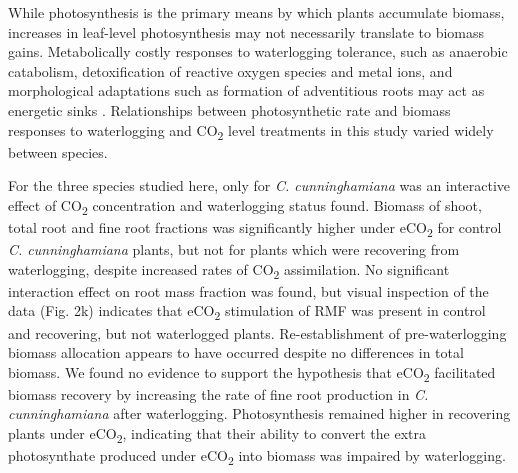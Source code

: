 \documentclass[openright,12pt,a4paper]{memoir}
\begin{document}
While photosynthesis is the primary means by which plants accumulate biomass, increases in leaf-level photosynthesis may not necessarily translate to biomass gains. Metabolically costly responses to waterlogging tolerance, such as anaerobic catabolism, detoxification of reactive oxygen species and metal ions, and morphological adaptations such as formation of adventitious roots may act as energetic sinks \citep{Colmer2009}. Relationships between photosynthetic rate and biomass responses to waterlogging and CO\textsubscript{2} level treatments in this study varied widely between species.

For the three species studied here, only for \textit{C. cunninghamiana} was an interactive effect of CO\textsubscript{2} concentration and waterlogging status found. Biomass of shoot, total root and fine root fractions was significantly higher under eCO\textsubscript{2} for control \textit{C. cunninghamiana} plants, but not for plants which were recovering from waterlogging, despite increased rates of CO\textsubscript{2} assimilation. No significant interaction effect on root mass fraction was found, but visual inspection of the data (Fig. 2k) indicates that eCO\textsubscript{2} stimulation of RMF was present in control and recovering, but not waterlogged plants. Re-establishment of pre-waterlogging biomass allocation appears to have occurred despite no differences in total biomass. We found no evidence to support the hypothesis that eCO\textsubscript{2} facilitated biomass recovery by increasing the rate of fine root production in \textit{C. cunninghamiana} after waterlogging. Photosynthesis remained higher in recovering plants under eCO\textsubscript{2}, indicating that their ability to convert the extra photosynthate produced under eCO\textsubscript{2} into biomass was impaired by waterlogging. 
\end{document}
